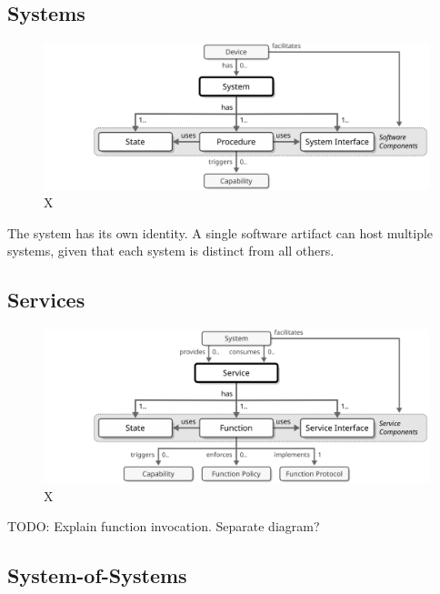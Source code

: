 \subsection{Systems}

\begin{figure}[ht!]
  \centering
  \includegraphics{figures/system}
  \caption{
    X
  }
  \label{fig:system}
\end{figure}

The system has its own identity. A single software artifact can host multiple systems, given that each system is distinct from all others.

\subsection{Services}

\begin{figure}[ht!]
  \centering
  \includegraphics{figures/service}
  \caption{
    X
  }
  \label{fig:service}
\end{figure}

TODO: Explain function invocation. Separate diagram?

\subsection{System-of-Systems}

